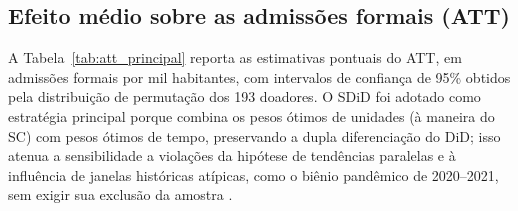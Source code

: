 \documentclass[a4paper,12pt]{article}
\begin{document}
\subsection{Efeito médio sobre as admissões formais (ATT)}
\label{sub:att}

A Tabela~\ref{tab:att_principal} reporta as estimativas pontuais do ATT, em
admissões formais por mil habitantes, com intervalos de confiança de 95\%
obtidos pela distribuição de permutação dos 193 doadores. O SDiD foi adotado
como estratégia principal porque combina os pesos ótimos de unidades (à
maneira do SC) com pesos ótimos de tempo, preservando a dupla diferenciação
do DiD; isso atenua a sensibilidade a violações da hipótese de tendências
paralelas e à influência de janelas históricas atípicas, como o biênio
pandêmico de 2020--2021, sem exigir sua exclusão da amostra
\cite{arkhangelsky2021, clarke2023}.
\end{document}
